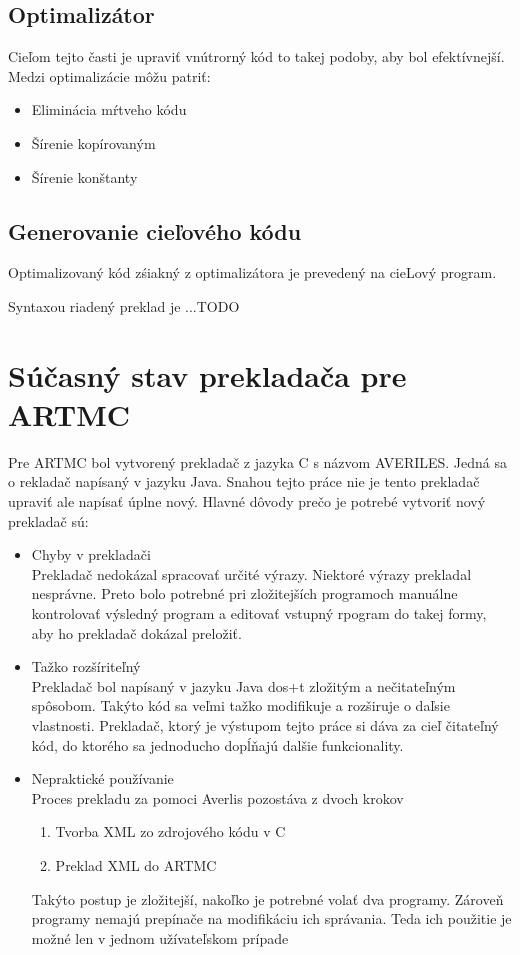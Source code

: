 \section{Optimalizátor}
Cieľom tejto časti je upraviť vnútrorný kód to takej podoby, aby bol efektívnejší.
Medzi optimalizácie môžu patriť:
\begin{itemize}
    \item Eliminácia mŕtveho kódu
    \item Šírenie kopírovaným
    \item Šírenie konštanty
\end{itemize}

\section{Generovanie cieľového kódu}
Optimalizovaný kód zśiakný z optimalizátora je prevedený na cieLový program.

Syntaxou riadený preklad je ...TODO

\chapter{Súčasný stav prekladača pre ARTMC}
Pre ARTMC bol vytvorený prekladač z jazyka C s názvom AVERILES. Jedná sa o
rekladač napísaný v jazyku Java. Snahou tejto práce nie je tento prekladač
upraviť ale napísať úplne nový. Hlavné dôvody prečo je potrebé vytvoriť nový
prekladač sú:
\begin{itemize}
    \item Chyby v prekladači\\
        Prekladač nedokázal spracovať určité výrazy. Niektoré výrazy prekladal nesprávne.
        Preto bolo potrebné pri zložitejších programoch manuálne kontrolovať výsledný
        program a editovať vstupný rpogram do takej formy, aby ho prekladač dokázal
        preložiť.
    \item Tažko rozšíriteľný\\
        Prekladač bol napísaný v jazyku Java dos+t zložitým a nečitateľným spôsobom. Takýto
        kód sa veľmi tažko modifikuje a rozširuje o daľsie vlastnosti. Prekladač,
        ktorý je výstupom tejto práce si dáva za cieľ čitateľný kód, do ktorého
        sa jednoducho dopĺňajú dalšie funkcionality.
    \item Nepraktické používanie\\
        Proces prekladu za pomoci Averlis pozostáva z dvoch krokov
        \begin{enumerate}
            \item Tvorba XML zo zdrojového kódu v C
            \item Preklad XML do ARTMC
        \end{enumerate}
        Takýto postup je zložitejší, nakoľko je potrebné volať dva programy.
        Zároveň programy nemajú prepínače na modifikáciu ich správania. Teda
        ich použitie je možné len v jednom užívateľskom prípade
\end{itemize}



